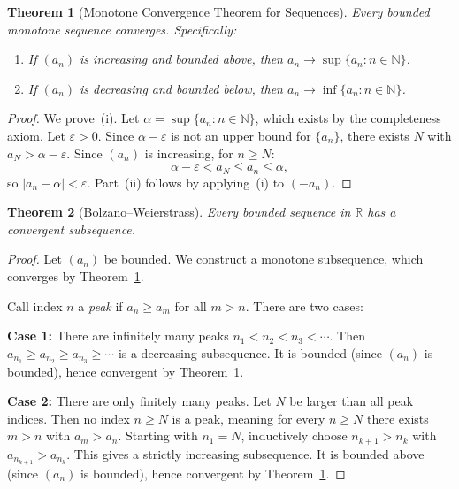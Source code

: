 \documentclass[11pt,a4paper]{article}
\theoremstyle{definition}
\theoremstyle{plain}
\newtheorem{theorem}{Theorem}[section]
\theoremstyle{remark}
\newcommand{\R}{\mathbb{R}}
\newcommand{\N}{\mathbb{N}}
\begin{document}
\begin{theorem}[Monotone Convergence Theorem for Sequences]
\label{thm:mct_seq}
Every bounded monotone sequence converges. Specifically:
\begin{enumerate}[nosep,label=(\roman*)]
    \item If $(a_n)$ is increasing and bounded above, then
    $a_n \to \sup\{a_n : n \in \N\}$.
    \item If $(a_n)$ is decreasing and bounded below, then
    $a_n \to \inf\{a_n : n \in \N\}$.
\end{enumerate}
\end{theorem}

\begin{proof}
We prove~(i). Let $\alpha = \sup\{a_n : n \in \N\}$, which exists by the
completeness axiom. Let $\varepsilon > 0$. Since $\alpha - \varepsilon$ is not
an upper bound for $\{a_n\}$, there exists $N$ with $a_N > \alpha - \varepsilon$.
Since $(a_n)$ is increasing, for $n \ge N$:
\[
\alpha - \varepsilon < a_N \le a_n \le \alpha,
\]
so $|a_n - \alpha| < \varepsilon$. Part~(ii) follows by applying~(i) to $(-a_n)$.
\end{proof}

\begin{theorem}[Bolzano--Weierstrass]
\label{thm:bolzano_weierstrass}
Every bounded sequence in $\R$ has a convergent subsequence.
\end{theorem}

\begin{proof}
Let $(a_n)$ be bounded. We construct a monotone subsequence, which converges by
Theorem~\ref{thm:mct_seq}.

Call index $n$ a \emph{peak} if $a_n \ge a_m$ for all $m > n$. There are two cases:

\textbf{Case 1:} There are infinitely many peaks $n_1 < n_2 < n_3 < \cdots$.
Then $a_{n_1} \ge a_{n_2} \ge a_{n_3} \ge \cdots$ is a decreasing subsequence.
It is bounded (since $(a_n)$ is bounded), hence convergent by
Theorem~\ref{thm:mct_seq}.

\textbf{Case 2:} There are only finitely many peaks. Let $N$ be larger than
all peak indices. Then no index $n \ge N$ is a peak, meaning for every $n \ge N$
there exists $m > n$ with $a_m > a_n$. Starting with $n_1 = N$, inductively choose
$n_{k+1} > n_k$ with $a_{n_{k+1}} > a_{n_k}$. This gives a strictly increasing
subsequence. It is bounded above (since $(a_n)$ is bounded), hence convergent by
Theorem~\ref{thm:mct_seq}.
\end{proof}
\end{document}

